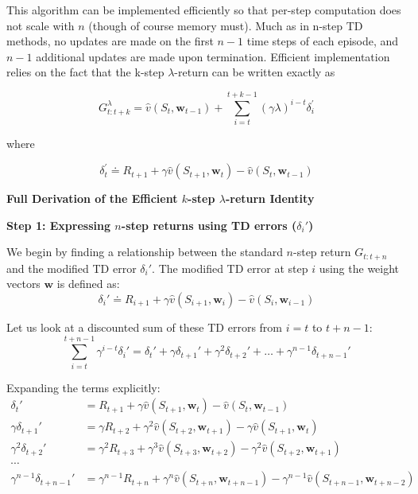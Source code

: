 \documentclass{article}
\begin{document}
This algorithm can be implemented efficiently so that per-step computation does not scale with $n$ (though of course memory must). Much as in n-step TD methods, no updates are made on the first $n - 1$ time steps of each episode, and $n - 1$ additional updates are made upon termination. 
Efficient implementation relies on the fact that the k-step $\lambda$-return can be written exactly as

$$
G _ { t : t + k } ^ { \lambda } = \hat { v } ( S _ { t } { , } \mathbf { w } _ { t - 1 } ) + \sum _ { i = t } ^ { t + k - 1 } ( \gamma \lambda ) ^ { i - t } \delta _ { i } ^ { \prime }
$$

where

$$
\delta _ { t } ^ { \prime } \doteq R _ { t + 1 } + \gamma \hat { v } ( S _ { t + 1 } \mathbf { , } \mathbf { w } _ { t } ) - \hat { v } ( S _ { t } \mathbf { , } \mathbf { w } _ { t - 1 } )
$$

\textbf{Full Derivation of the Efficient $k$-step $\lambda$-return Identity}

\textbf{Step 1: Expressing $n$-step returns using TD errors ($\delta_i'$)}

We begin by finding a relationship between the standard $n$-step return $G_{t:t+n}$ and the modified TD error $\delta_i'$. The modified TD error at step $i$ using the weight vectors $\mathbf{w}$ is defined as:
\begin{equation}
\delta_i' \doteq R_{i+1} + \gamma \hat{v}(S_{i+1}, \mathbf{w}_i) - \hat{v}(S_i, \mathbf{w}_{i-1})
\end{equation}

Let us look at a discounted sum of these TD errors from $i = t$ to $t+n-1$:
\begin{equation}
\sum_{i=t}^{t+n-1} \gamma^{i-t} \delta_i' = \delta_t' + \gamma \delta_{t+1}' + \gamma^2 \delta_{t+2}' + \dots + \gamma^{n-1} \delta_{t+n-1}'
\end{equation}

Expanding the terms explicitly:
\begin{align*}
\delta_t' &= R_{t+1} + \gamma \hat{v}(S_{t+1}, \mathbf{w}_t) - \hat{v}(S_t, \mathbf{w}_{t-1}) \\
\gamma \delta_{t+1}' &= \gamma R_{t+2} + \gamma^2 \hat{v}(S_{t+2}, \mathbf{w}_{t+1}) - \gamma \hat{v}(S_{t+1}, \mathbf{w}_t) \\
\gamma^2 \delta_{t+2}' &= \gamma^2 R_{t+3} + \gamma^3 \hat{v}(S_{t+3}, \mathbf{w}_{t+2}) - \gamma^2 \hat{v}(S_{t+2}, \mathbf{w}_{t+1}) \\
\cdots \\
\gamma^{n-1} \delta_{t+n-1}' &= \gamma^{n-1} R_{t+n} + \gamma^n \hat{v}(S_{t+n}, \mathbf{w}_{t+n-1}) - \gamma^{n-1} \hat{v}(S_{t+n-1}, \mathbf{w}_{t+n-2})
\end{align*}
\end{document}
